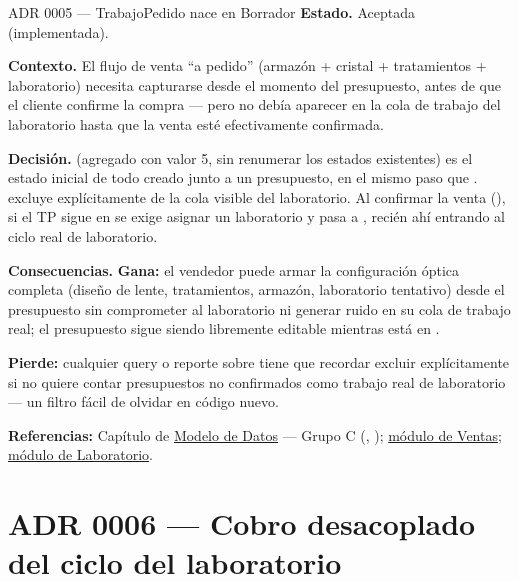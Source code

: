 \begin{cajaADR}{ADR 0005 --- TrabajoPedido nace en Borrador}
\textbf{Estado.} Aceptada (implementada).

\textbf{Contexto.} El flujo de venta ``a pedido'' (armazón + cristal + tratamientos + laboratorio) necesita capturarse desde el momento del presupuesto, antes de que el cliente confirme la compra --- pero no debía aparecer en la cola de trabajo del laboratorio hasta que la venta esté efectivamente confirmada.

\textbf{Decisión.} \allowbreak {} (agregado con valor 5, sin renumerar los estados existentes) es el estado inicial de todo  creado junto a un presupuesto, en el mismo paso que . \allowbreak {}\allowbreak {}\allowbreak {} excluye explícitamente  de la cola visible del laboratorio. Al confirmar la venta (\allowbreak {}\allowbreak {}), si el TP sigue en  se exige asignar un laboratorio y pasa a \allowbreak {}, recién ahí entrando al ciclo real de laboratorio.

\textbf{Consecuencias.} \textbf{Gana:} el vendedor puede armar la configuración óptica completa (diseño de lente, tratamientos, armazón, laboratorio tentativo) desde el presupuesto sin comprometer al laboratorio ni generar ruido en su cola de trabajo real; el presupuesto sigue siendo libremente editable mientras está en .

\textbf{Pierde:} cualquier query o reporte sobre  tiene que recordar excluir  explícitamente si no quiere contar presupuestos no confirmados como trabajo real de laboratorio --- un filtro fácil de olvidar en código nuevo.
\end{cajaADR}

\textbf{Referencias:} Capítulo de \hyperref[sec:modelo-datos]{Modelo de Datos} --- Grupo C (, \allowbreak {}\allowbreak {}); \hyperref[mod:08-ventas]{módulo de Ventas}; \hyperref[mod:09-laboratorio]{módulo de Laboratorio}.

\section{ADR 0006 --- Cobro desacoplado del ciclo del laboratorio}
\label{adr:0006}

